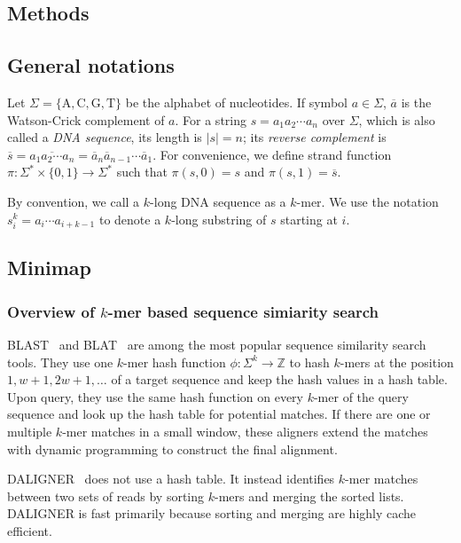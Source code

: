 \documentclass{bioinfo}
\begin{document}
\begin{methods}
\section{Methods}

\subsection{General notations}

Let $\Sigma=\{\mathrm{A},\mathrm{C},\mathrm{G},\mathrm{T}\}$ be the
alphabet of nucleotides. If symbol $a\in\Sigma$, $\overline{a}$ is the
Watson-Crick complement of $a$. For a string $s=a_1a_2\cdots a_n$ over
$\Sigma$, which is also called a \emph{DNA sequence}, its length is $|s|=n$;
its \emph{reverse complement} is $\overline{s}=\overline{a_1a_2\cdots
a_n}=\overline{a}_n\overline{a}_{n-1}\cdots\overline{a}_1$.
For convenience, we define strand function
$\pi:\Sigma^*\times\{0,1\}\to\Sigma^*$ such that $\pi(s,0)=s$ and
$\pi(s,1)=\overline{s}$.

By convention, we call a $k$-long DNA sequence as a $k$-mer. We use the
notation $s^k_i=a_i\cdots a_{i+k-1}$ to denote a $k$-long substring of $s$
starting at $i$.

\subsection{Minimap}

\subsubsection{Overview of $k$-mer based sequence simiarity search}\label{sec:minimapov}

BLAST~\citep{Altschul:1997vn} and BLAT~\citep{Kent:2002jk} are among the most
popular sequence similarity search tools. They use one $k$-mer hash function
$\phi:\Sigma^k\to\mathbb{Z}$ to hash $k$-mers at the position
$1,w+1,2w+1,\ldots$ of a target sequence and keep the hash values in a hash
table. Upon query, they use the same hash function on every $k$-mer of the
query sequence and look up the hash table for potential matches. If there are
one or multiple $k$-mer matches in a small window, these aligners extend the
matches with dynamic programming to construct the final alignment.

DALIGNER~\citep{DBLP:conf/wabi/Myers14} does not use a hash table. It instead
identifies $k$-mer matches between two sets of reads by sorting $k$-mers and
merging the sorted lists. DALIGNER is fast primarily because sorting and
merging are highly cache efficient.


\end{methods}
\end{document}
